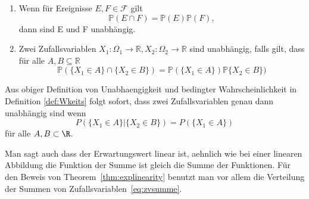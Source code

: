 \begin{Def}

\begin{enumerate}
	\item Wenn f\"ur Ereignisse $E, F \in \mathcal{F} $ gilt
	\begin{equation} 
	\mathbb{P} (E\cap F)= \mathbb{P} (E)  \mathbb{P} (F),
	\end{equation}
        dann sind E und F unabhängig. 
\item Zwei Zufallsvariablen $X_1 : \Omega_1 \to \mathbb{R}, X_2:\Omega_2 \to \mathbb{R}$
sind unabhängig, falls gilt, dass für alle $A, B \subseteq \mathbb{R}$
\begin{equation*}
\mathbb{P} (\{X_{1} \in A\} \cap \{X_{2} \in B\} ) = \mathbb{P} (\{X_{1} \in A\})  \mathbb{P} \{X_{2} \in B\} )
\end{equation*}
\end{enumerate}

Aus obiger Definition von Unabhaengigkeit und bedingter Wahrscheinlichkeit in Definition \ref{def:Wkeits} folgt sofort, dass zwei Zufallsvariablen  genau dann unabh\"angig sind wenn
\begin{equation*}
P(\{X_1 \in A\} | \{X_2 \in B\}) = P(\{X_1\in A\})
\end{equation*}
f\"ur alle $A,B \subset \R$. 

\end{Def}


\begin{Thm}[Linearit\"at des Erwartungswerts]
\label{thm:explinearity}
Für die Summe beliebiger Zufallsvariablen $X_{1}, \dots, X_{n}}$ gilt
\begin{equation*}
\mathbb{E} \left[\sum_{i=1}^{n} a_{i} X_{i}\right] = \sum_{i=1}^{n} a_{i} (\mathbb{E} [X_{i}] )
\end{equation*}
\end{Thm}

Man sagt auch dass der Erwartungswert linear ist, aehnlich wie bei einer linearen Abbildung die Funktion der Summe ist gleich die Summe der Funktionen. F\"ur den Beweis von Theorem~\ref{thm:explinearity} benutzt man vor allem die Verteilung der Summen von Zufallsvariablen~\eqref{eq:zvsumme}.

